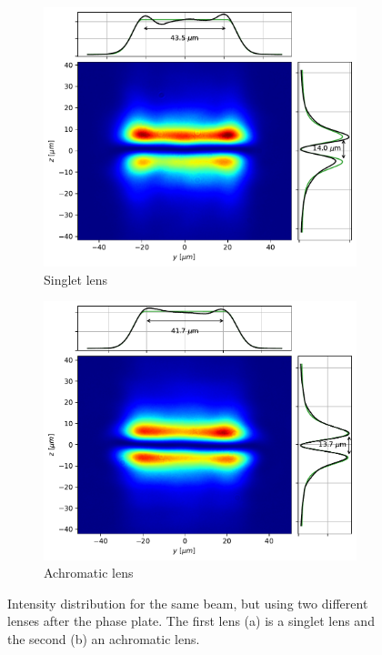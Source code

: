 \begin{figure}
    \centering
    \begin{subfigure}{0.45\textwidth}
        \includegraphics[width=\textwidth]{chapters/chapter_3/figures/sing.pdf}
        \caption{Singlet lens}
        \label{fig:singlet}
    \end{subfigure}
    \hfill
    \begin{subfigure}{0.45\textwidth}
        \includegraphics[width=\textwidth]{chapters/chapter_3/figures/achr.pdf}
        \caption{Achromatic lens}
        \label{fig:achr}
    \end{subfigure}
    \caption{Intensity distribution for the same beam, but using two different lenses after the phase plate. The first lens (a) is a singlet lens and the second (b) an achromatic lens.}
    \label{fig:sing_achr}
\end{figure}

